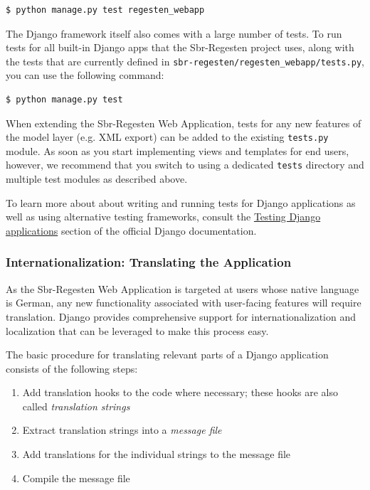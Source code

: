 \begin{verbatim}
$ python manage.py test regesten_webapp
\end{verbatim}

The Django framework itself also comes with a large number of tests.
To run tests for all built-in Django apps that the Sbr-Regesten
project uses, along with the tests that are currently defined in
\texttt{sbr-regesten/regesten\_webapp/tests.py}, you can use the
following command:

\begin{verbatim}
$ python manage.py test
\end{verbatim}

When extending the Sbr-Regesten Web Application, tests for any new
features of the model layer (e.g. XML export) can be added to the
existing \texttt{tests.py} module. As soon as you start implementing
views and templates for end users, however, we recommend that you
switch to using a dedicated \texttt{tests} directory and multiple test
modules as described above.

To learn more about about writing and running tests for Django
applications as well as using alternative testing frameworks, consult
the
\href{https://docs.djangoproject.com/en/1.4/topics/testing/}{Testing
  Django applications} section of the official Django documentation.

\subsubsection{Internationalization: Translating the Application}
\label{sec:translate}

As the Sbr-Regesten Web Application is targeted at users whose native
language is German, any new functionality associated with user-facing
features will require translation. Django provides comprehensive
support for internationalization and localization that can be
leveraged to make this process easy.

The basic procedure for translating relevant parts of a Django
application consists of the following steps:

\begin{enumerate}
\item Add translation hooks to the code where necessary; these hooks
  are also called \emph{translation strings}
\item Extract translation strings into a \emph{message file}
\item Add translations for the individual strings to the message file
\item Compile the message file
\end{enumerate}

